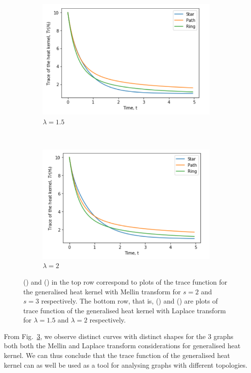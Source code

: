 \documentclass[10pt,a4paper]{article}
\begin{document}
\begin{figure}[H]
\begin{subfigure}[b]{0.35\textwidth}
        		\includegraphics[width= \textwidth]{images/graphskernellaplace15.png}
        		\caption{$\lambda=1.5$}
        		\label{threegraphlaplace15}
        	\end{subfigure}~
        	\begin{subfigure}[b]{0.35\textwidth}
        		\includegraphics[width= \textwidth]{images/graphskernellaplace2.png}
        		\caption{$\lambda=2$}
        		\label{threegraphLaplace2}
        	\end{subfigure}
        	\caption{() and () in the top row correspond to plots of the trace function for the generalised heat kernel with Mellin transform for $s=2$ and $s=3$ respectively. The bottom row, that is, () and () are plots of trace function of the generalised heat kernel with Laplace transform for $\lambda=1.5$ and $\lambda=2$ respectively.}
        	\label{genthreegraphsTraceplots}
        \end{figure}
        From Fig.~\ref{genthreegraphsTraceplots}, we observe distinct curves with distinct shapes for the $3$ graphs both both the Mellin and Laplace transform considerations for generalised heat kernel. We can thus conclude that the trace function of the generalised heat kernel can as well be used as a tool for analysing graphs with different topologies.
        
\end{document}
